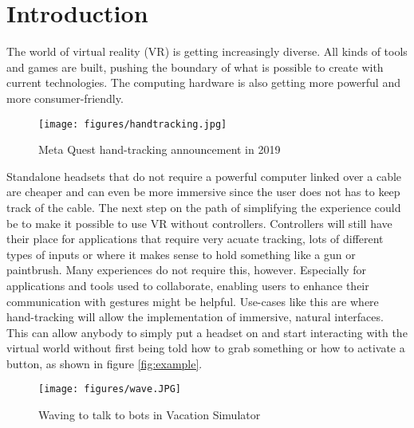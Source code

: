 
\chapter{Introduction}
The world of virtual reality (VR) is getting increasingly diverse. All kinds of tools and games are built, pushing the boundary of what is possible to create with current technologies. The computing hardware is also getting more powerful and more consumer-friendly.

\begin{figure}[!h]
    \centering
    \texttt{[image: figures/handtracking.jpg]}
    \caption{Meta Quest hand-tracking announcement in 2019 \cite{annoucment}}
    \label{fig:quest}
\end{figure}

Standalone headsets that do not require a powerful computer linked over a cable are cheaper and can even be more immersive since the user does not has to keep track of the cable. The next step on the path of simplifying the experience could be to make it possible to use VR without controllers. Controllers will still have their place for applications that require very acuate tracking, lots of different types of inputs or where it makes sense to hold something like a gun or paintbrush. Many experiences do not require this, however. 
Especially for applications and tools used to collaborate, enabling users to enhance their communication with gestures might be helpful. Use-cases like this are where hand-tracking will allow the implementation of immersive, natural interfaces. This can allow anybody to simply put a headset on and start interacting with the virtual world without first being told how to grab something or how to activate a button, as shown in figure \ref{fig:example}.

\begin{figure}[!h]
    \centering
    \texttt{[image: figures/wave.JPG]}
    \caption{Waving to talk to bots in Vacation Simulator}
    \label{fig:waving}
\end{figure}

